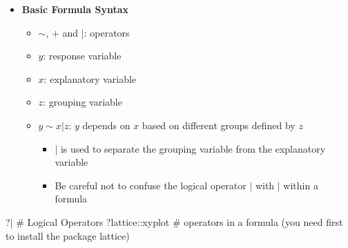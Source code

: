 \documentclass[
  ignorenonframetext,
]{beamer}
\newenvironment{Shaded}{\begin{snugshade}}{\end{snugshade}}
\newcommand{\AttributeTok}[1]{\textcolor[rgb]{0.40,0.45,0.13}{#1}}
\newcommand{\CommentTok}[1]{\textcolor[rgb]{0.37,0.37,0.37}{#1}}
\newcommand{\NormalTok}[1]{\textcolor[rgb]{0.00,0.23,0.31}{#1}}
\newcommand{\SpecialCharTok}[1]{\textcolor[rgb]{0.37,0.37,0.37}{#1}}
\newcommand{\StringTok}[1]{\textcolor[rgb]{0.13,0.47,0.30}{#1}}
\providecommand{\tightlist}{%
  \setlength{\itemsep}{0pt}\setlength{\parskip}{0pt}}\usepackage{longtable,booktabs,array}
\begin{document}
\begin{frame}[fragile]{}
\label{section-11}
\begin{itemize}
\item
  \textbf{Basic Formula Syntax}

  \begin{itemize}
  \item
    \(\sim\), \(+\) and \(|\): operators
  \item
    \(y\): response variable
  \item
    \(x\): explanatory variable
  \item
    \(z\): grouping variable
  \item
    \(y \sim x | z\): \(y\) depends on \(x\) based on different groups
    defined by \(z\)

    \begin{itemize}
    \tightlist
    \item
      \(|\) is used to separate the grouping variable from the
      explanatory variable
    \item
      Be careful not to confuse the logical operator \(|\) with \(|\)
      within a formula
    \end{itemize}
  \end{itemize}
\end{itemize}

\tiny

\begin{Shaded}
\begin{Highlighting}[]
\NormalTok{?}\StringTok{\textasciigrave{}}\AttributeTok{|}\StringTok{\textasciigrave{}} \CommentTok{\# Logical Operators}
\NormalTok{?lattice}\SpecialCharTok{::}\NormalTok{xyplot }\CommentTok{\# operators in a formula (you need first to install the package lattice)}
\end{Highlighting}
\end{Shaded}
\end{frame}
\end{document}
